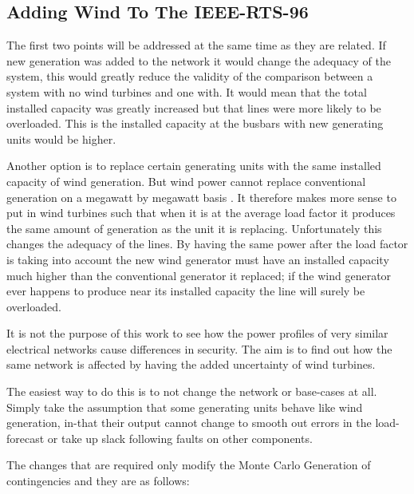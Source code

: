 \documentclass[a4paper,oneside,12pt]{report}
\begin{document}
\subsection{Adding Wind To The IEEE-RTS-96}

The first two points will be addressed at the same time as they are related. If new generation was added to the network it would change the adequacy of the system, this would greatly reduce the validity of the comparison between a system with no wind turbines and one with. It would mean that the total installed capacity was greatly increased but that lines were more likely to be overloaded. This is the installed capacity at the busbars with new generating units would be higher. 

Another option is to replace certain generating units with the same installed capacity of wind generation. But wind power cannot replace conventional generation on a megawatt by megawatt basis \cite{Strbac2007}. It therefore makes more sense to put in wind turbines such that when it is at the average load factor it produces the same amount of generation as the unit it is replacing. Unfortunately this changes the adequacy of the lines. By having the same power after the load factor is taking into account the new wind generator must have an installed capacity much higher than the conventional generator it replaced; if the wind generator ever happens to produce near its installed capacity the line will surely be overloaded. 

It is not the purpose of this work to see how the power profiles of very similar electrical networks cause differences in security. The aim is to find out how the same network is affected by having the added uncertainty of wind turbines. 

The easiest way to do this is to not change the network or base-cases at all. Simply take the assumption that some generating units behave like wind generation, in-that their output cannot change to smooth out errors in the load-forecast or take up slack following faults on other components. 

The changes that are required only modify the Monte Carlo Generation of contingencies and they are as follows: 
\end{document}
